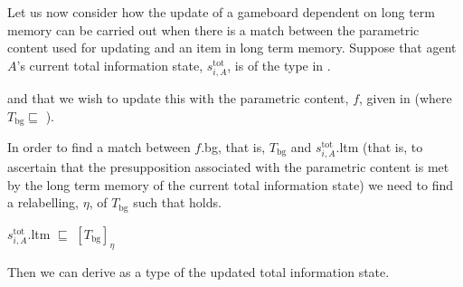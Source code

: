 Let us now consider how the update of a gameboard dependent on long
term memory can be carried out when there is a match between the
parametric content used for updating and an item in long term memory.
Suppose that agent $A$'s current total information state, $s_{i,A}^{\text{tot}}$, is of the type in \nexteg{}.
\begin{ex} 
\end{ex} 
and that we wish to update this with the parametric content, $f$, given in \nexteg{} (where
$T_{\mathrm{bg}}\sqsubseteq$ ).
\begin{ex}
\end{ex} 
In order to find a match between $f$.bg, that is, $T_{\mathrm{bg}}$ and $s_{i,A}^{\text{tot}}$.ltm
(that is, to ascertain that the presupposition associated with the
parametric content is met by the long term memory of the current total
information state) we need to find a relabelling, $\eta$, of $T_{\mathrm{bg}}$ such that
\nexteg{} holds.
\begin{ex} 
$s_{i,A}^{\text{tot}}$.ltm $\sqsubseteq$ $[T_{\mathrm{bg}}]_\eta$ 
\end{ex} 
Then we can derive \nexteg{} as a type of the updated total
information state.
\begin{ex} 

 
\end{ex}

